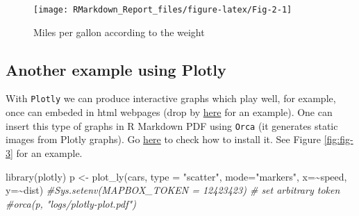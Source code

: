 \documentclass[
  12pt,
]{article}
\newenvironment{Shaded}{\begin{snugshade}}{\end{snugshade}}
\newcommand{\AttributeTok}[1]{\textcolor[rgb]{0.77,0.63,0.00}{#1}}
\newcommand{\CommentTok}[1]{\textcolor[rgb]{0.56,0.35,0.01}{\textit{#1}}}
\newcommand{\FunctionTok}[1]{\textcolor[rgb]{0.00,0.00,0.00}{#1}}
\newcommand{\NormalTok}[1]{#1}
\newcommand{\OtherTok}[1]{\textcolor[rgb]{0.56,0.35,0.01}{#1}}
\newcommand{\SpecialCharTok}[1]{\textcolor[rgb]{0.00,0.00,0.00}{#1}}
\newcommand{\StringTok}[1]{\textcolor[rgb]{0.31,0.60,0.02}{#1}}
\begin{document}
\begin{figure}[H]

{\centering \texttt{[image: RMarkdown\_Report\_files/figure-latex/Fig-2-1]} 

}

\caption{Miles per gallon according to the weight}\label{fig:Fig-2}
\end{figure}

\hypertarget{another-example-using-plotly}{%
\subsection{Another example using Plotly}\label{another-example-using-plotly}}

With \texttt{Plotly} we can produce interactive graphs which play well, for example, once can embeded in html webpages (drop by \href{https://paulcbauer.shinyapps.io/visualizing-causal-scenarios/}{here} for an example). One can insert this type of graphs in R Markdown PDF using \texttt{Orca} (it generates static images from Plotly graphs). Go \href{https://github.com/plotly/orca\#installation}{here} to check how to install it. See Figure \ref{fig:fig-3} for an example.

\begin{Shaded}
\begin{Highlighting}[]
\FunctionTok{library}\NormalTok{(plotly)}
\NormalTok{p }\OtherTok{\textless{}{-}} \FunctionTok{plot\_ly}\NormalTok{(cars, }\AttributeTok{type =} \StringTok{"scatter"}\NormalTok{, }\AttributeTok{mode=}\StringTok{"markers"}\NormalTok{,}
        \AttributeTok{x=}\SpecialCharTok{\textasciitilde{}}\NormalTok{speed,}
        \AttributeTok{y=}\SpecialCharTok{\textasciitilde{}}\NormalTok{dist)}
\CommentTok{\#Sys.setenv(\textquotesingle{}MAPBOX\_TOKEN\textquotesingle{} = \textquotesingle{}12423423\textquotesingle{}) \# set arbitrary token}
\CommentTok{\#orca(p, "logs/plotly{-}plot.pdf")}
\end{Highlighting}
\end{Shaded}
\end{document}
